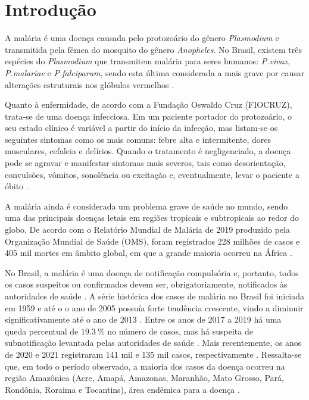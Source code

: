 \chapter{Introdução}

A malária é uma doença causada pelo protozoário do gênero \emph{Plasmodium} e transmitida pela fêmea do mosquito do gênero \emph{Anopheles}. No Brasil, existem três espécies do \emph{Plasmodium} que transmitem malária para seres humanos: \emph{P.\@ vivax}, \emph{P.\@ malariae} e \emph{P.\@ falciparum}, sendo esta última considerada a mais grave por causar alterações estruturais nos glóbulos vermelhos \cite{Gomes:2011,Loiola:2002}.

Quanto à enfermidade, de acordo com a Fundação Oswaldo Cruz (FIOCRUZ), trata-se de uma doença infecciosa.  Em um paciente portador do protozoário, o seu estado clínico é variável a partir do início da infecção, mas listam-se os seguintes sintomas como os mais comuns: febre alta e intermitente, dores musculares, cefaleia e delírios. Quando o tratamento é negligenciado, a doença pode se agravar e manifestar sintomas mais severos, tais como desorientação, convulsões, vômitos, sonolência ou excitação e, eventualmente, levar o paciente a óbito \cite{FIOCRUZ:Site}.

A malária ainda é considerada um problema grave de saúde no mundo, sendo uma das principais doenças letais em regiões tropicais e subtropicais ao redor do globo. De acordo com o Relatório Mundial de Malária de 2019 produzido pela Organização Mundial de Saúde (OMS), foram registrados 228 milhões de casos e 405 mil mortes em âmbito global, em que a grande maioria ocorreu na África \cite{OMS:Malaria2019}.

No Brasil, a malária é uma doença de notificação compulsória e, portanto, todos os casos suspeitos ou confirmados devem ser, obrigatoriamente, notificados às autoridades de saúde \cite{Brasil:DecretoMalaria}. A série histórica dos casos de malária no Brasil foi iniciada em 1959 e até o o ano de 2005 possuía forte tendência crescente, vindo a diminuir significativamente até o ano de 2013 \cite{Boletim:2013}. Entre os anos de 2017 a 2019 há uma queda percentual de $\SI{19,3}{\percent}$ no número de casos, mas há suspeita de subnotificação levantada pelas autoridades de saúde \cite{Boletim:Malaria2020}. Mais recentemente, os anos de 2020 e 2021 registraram 141 mil e 135 mil casos, respectivamente \cite{Boletim:Malaria2022}. Ressalta-se que, em todo o período observado, a maioria dos casos da doença ocorreu na região Amazônica (Acre, Amapá, Amazonas, Maranhão, Mato Grosso, Pará, Rondônia, Roraima e Tocantins), área endêmica para a doença \cite{Brasil:SINAN}.


